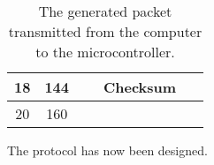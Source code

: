 \begin{table}[H]
\begin{tabular}{llclllllllllllllll}
		\multicolumn{1}{|c|}{18}   & \multicolumn{1}{c|}{144} & \multicolumn{16}{c|}{Checksum}                                                       \\ \hline
		\multicolumn{1}{|c|}{20}   & \multicolumn{1}{c|}{160} & \multicolumn{8}{c|}{}                                                                                                                                                                                 & \multicolumn{1}{c|}{}  & \multicolumn{1}{c|}{}  & \multicolumn{1}{c|}{}   & \multicolumn{1}{c|}{}   & \multicolumn{1}{c|}{}   & \multicolumn{1}{c|}{}   & \multicolumn{1}{c|}{}   & \multicolumn{1}{c|}{}   \\ \hline
	\end{tabular}
	\caption{The generated packet transmitted from the computer to the microcontroller.}
	\label{tab:packetstructure2}
\end{table}

The protocol has now been designed.